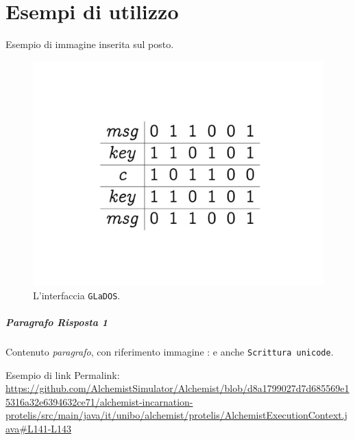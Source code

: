\documentclass[a4paper,12pt]{report}
\begin{document}
\chapter{Esempi di utilizzo}
Esempio di immagine inserita sul posto.
\begin{figure}[h]
\centering{}
\includegraphics[width=\textwidth]{img/example_img.pdf}
\caption{L'interfaccia \texttt{GLaDOS}.}
\label{img:example}
\end{figure}

\paragraph{Paragrafo Risposta 1} Contenuto \textit{paragrafo}, con riferimento immagine
: e anche \texttt{Scrittura unicode}.

Esempio di link
Permalink: \url{https://github.com/AlchemistSimulator/Alchemist/blob/d8a1799027d7d685569e15316a32e6394632ce71/alchemist-incarnation-protelis/src/main/java/it/unibo/alchemist/protelis/AlchemistExecutionContext.java#L141-L143}







\end{document}

